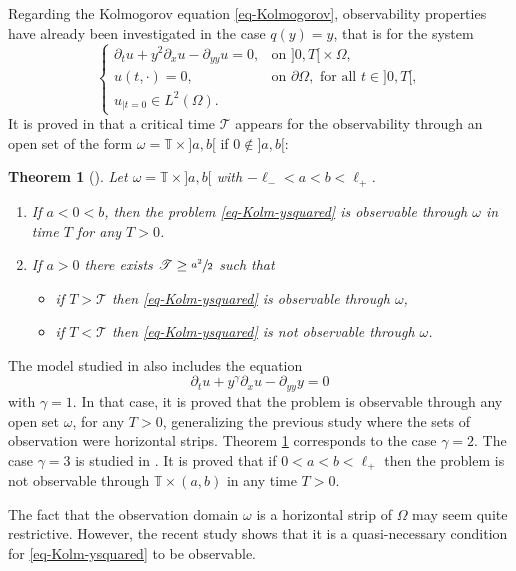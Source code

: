 \documentclass[11pt]{article}
\numberwithin{equation}{section}
\let\mathcal\mathscr
\theoremstyle{plain}
\newtheorem{theorem}{{Theorem}}[section]
\theoremstyle{definition}
\newcommand{\1}{\mathds 1}
\newcommand{\T}{\mathbb{T}}
\let\O\Omega
\newcommand{\Tc}{{\mathcal T}}
\begin{document}
Regarding the Kolmogorov equation \eqref{eq-Kolmogorov}, observability properties have already been investigated in the
case $q(y) = y$, that is for the system
\begin{equation} \label{eq-Kolm-ysquared}
\begin{cases}
\partial_t u + y^2 \partial_x u - \partial_{yy} u = 0, & \text{on } ]0,T[{}\times \O,\\
u(t,\cdot) = 0, & \text{on } \partial\O, \text{ for all } t \in{}]0,T[,\\
u_{|t=0} \in L^2 (\O).
\end{cases}
\end{equation}
It is proved in \cite{Beauchard14} that a critical time $\Tc$ appears for the observability through an open set of the form $\omega = \T\times{}]a,b[$ if $0 \notin{}]a,b[$:

\begin{theorem}[\cite{Beauchard14}] \label{th-KB}
Let $\omega = \T \times{}]a,b[$ with $-\ell_- < a < b< \ell_+$.
\begin{enumerate}
\item If $a < 0 < b$, then the problem \eqref{eq-Kolm-ysquared} is observable through $\omega$ in time $T$ for any $T>0$.
\item If $a > 0$ there exists $\Tc \geq \sfrac{a^2}{2}$ such that
\begin{itemize}
\item if $T > \Tc$ then \eqref{eq-Kolm-ysquared} is observable through $\omega$,
\item if $T < \Tc$ then \eqref{eq-Kolm-ysquared} is not observable through $\omega$.
\end{itemize}
\end{enumerate}
\end{theorem}

The model studied in \cite{Beauchard14} also includes the equation
\[
\partial_t u + y^\gamma \partial_{x} u - \partial_{yy} y = 0
\]
with $\gamma = 1$. In that case, it is proved that the problem is observable through any open set $\omega$, for any $T > 0$, generalizing the previous study \cite{Beauchard_Zuazua_09} where the sets of observation were horizontal strips. Theorem \ref{th-KB} corresponds to the case $\gamma = 2$. The case $\gamma = 3$ is studied in \cite{beauchard_henry}. It is proved that if $0<a<b< \ell_+$ then the problem is not observable through $\T \times (a,b)$ in any time $T>0$.

The fact that the observation domain $\omega$ is a horizontal strip of $\O$ may seem quite restrictive. However,
the recent study \cite{koenig18} shows that it is a quasi-necessary condition for \eqref{eq-Kolm-ysquared} to be observable.
\end{document}
